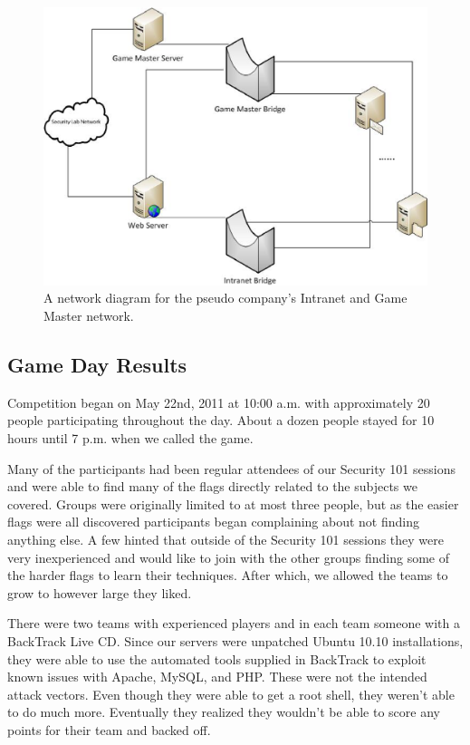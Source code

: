 \documentclass[10pt]{article}
\begin{document}
\begin{figure}[here]
\includegraphics[scale=.75]{resources/dukenukem_intranet_diagram.eps}
\caption{A network diagram for the pseudo company's Intranet and Game Master
network.}
\label{fig:dukeNukemIntranetDiagram}
\end{figure}

\subsection{Game Day Results}
Competition began on May 22nd, 2011 at 10:00 a.m. with approximately 20 people
participating throughout the day. About a dozen people stayed for 10 hours until
7 p.m. when we called the game. 

Many of the participants had been regular attendees of our Security 101 sessions
and were able to find many of the flags directly related to the subjects we
covered. Groups were originally limited to at most three people, but as the
easier flags were all discovered participants began complaining about not
finding anything else. A few hinted that outside of the Security 101 sessions
they were very inexperienced and would like to join with the other groups
finding some of the harder flags to learn their techniques. After which, we
allowed the teams to grow to however large they liked.

There were two teams with experienced players and in each team someone with a
BackTrack Live CD. Since our servers were unpatched Ubuntu 10.10 installations,
they were able to use the automated tools supplied in BackTrack to exploit
known issues with Apache, MySQL, and PHP. These were not the intended attack
vectors. Even though they were able to get a root shell, they weren't able to do
much more. Eventually they realized they wouldn't be able to score any points
for their team and backed off. 
\end{document}
